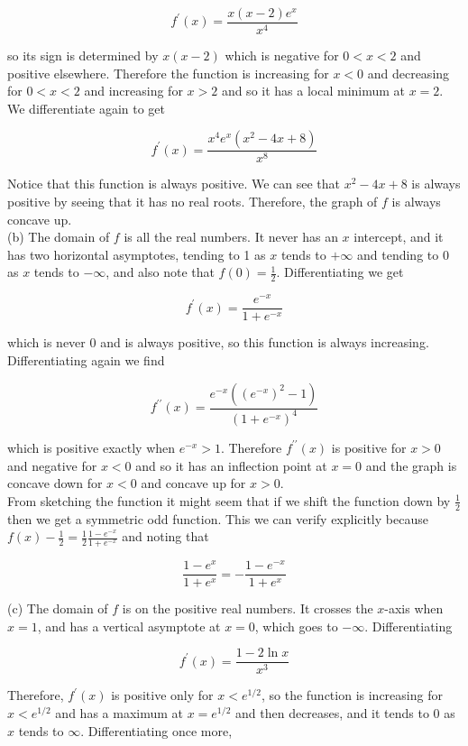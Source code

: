 \documentclass[10pt]{article}
\begin{document}
$$
f^{\prime}(x)=\frac{x(x-2) e^{x}}{x^{4}}
$$

so its sign is determined by $x(x-2)$ which is negative for $0<x<2$ and positive elsewhere. Therefore the function is increasing for $x<0$ and decreasing for $0<x<2$ and increasing for $x>2$ and so it has a local minimum at $x=2$. We differentiate again to get

$$
f^{\prime}(x)=\frac{x^{4} e^{x}\left(x^{2}-4 x+8\right)}{x^{8}}
$$

Notice that this function is always positive. We can see that $x^{2}-4 x+8$ is always positive by seeing that it has no real roots. Therefore, the graph of $f$ is always concave up.\\
(b) The domain of $f$ is all the real numbers. It never has an $x$ intercept, and it has two horizontal asymptotes, tending to 1 as $x$ tends to $+\infty$ and tending to 0 as $x$ tends to $-\infty$, and also note that $f(0)=\frac{1}{2}$. Differentiating we get

$$
f^{\prime}(x)=\frac{e^{-x}}{1+e^{-x}}
$$

which is never 0 and is always positive, so this function is always increasing. Differentiating again we find

$$
f^{\prime \prime}(x)=\frac{e^{-x}\left(\left(e^{-x}\right)^{2}-1\right)}{\left(1+e^{-x}\right)^{4}}
$$

which is positive exactly when $e^{-x}>1$. Therefore $f^{\prime \prime}(x)$ is positive for $x>0$ and negative for $x<0$ and so it has an inflection point at $x=0$ and the graph is concave down for $x<0$ and concave up for $x>0$.\\
From sketching the function it might seem that if we shift the function down by $\frac{1}{2}$ then we get a symmetric odd function. This we can verify explicitly because $f(x)-\frac{1}{2}=\frac{1}{2} \frac{1-e^{-x}}{1+e^{-x}}$ and noting that

$$
\frac{1-e^{x}}{1+e^{x}}=-\frac{1-e^{-x}}{1+e^{x}}
$$

(c) The domain of $f$ is on the positive real numbers. It crosses the $x$-axis when $x=1$, and has a vertical asymptote at $x=0$, which goes to $-\infty$. Differentiating

$$
f^{\prime}(x)=\frac{1-2 \ln x}{x^{3}}
$$

Therefore, $f^{\prime}(x)$ is positive only for $x<e^{1 / 2}$, so the function is increasing for $x<e^{1 / 2}$ and has a maximum at $x=e^{1 / 2}$ and then decreases, and it tends to 0 as $x$ tends to $\infty$. Differentiating once more,
\end{document}

